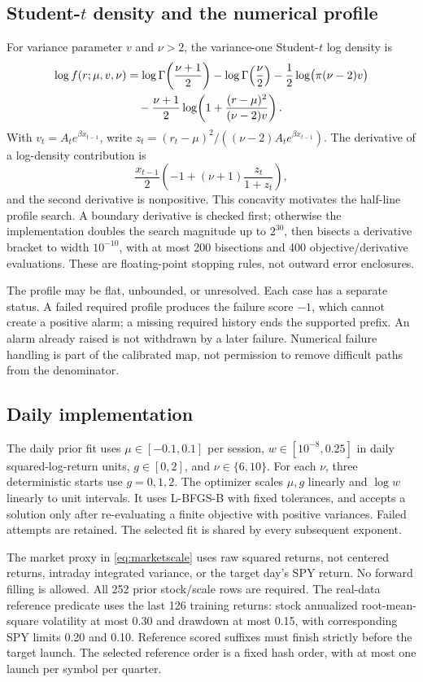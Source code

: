 \subsection{\texorpdfstring{Student-$t$}{Student-t} density and the numerical profile}
For variance parameter $v$ and $\nu>2$, the variance-one Student-$t$
log density is
\begin{align}\label{eq:tdensity}
 \log f(r;\mu,v,\nu)
 &=\log\Gamma\!\left(\frac{\nu+1}{2}\right)
  -\log\Gamma\!\left(\frac\nu2\right)
  -\frac12\log\bigl(\pi(\nu-2)v\bigr)\notag\\
 &\quad-\frac{\nu+1}{2}
      \log\!\left(1+\frac{(r-\mu)^2}{(\nu-2)v}\right).
\end{align}
With $v_t=A_t e^{\beta x_{t-1}}$, write
$z_t=(r_t-\mu)^2/((\nu-2)A_t e^{\beta x_{t-1}})$.
The derivative of a log-density contribution is
\[
 \frac{x_{t-1}}2\left(-1+(\nu+1)\frac{z_t}{1+z_t}\right),
\]
and the second derivative is nonpositive. This concavity motivates the
half-line profile search. A boundary derivative is checked first;
otherwise the implementation doubles the search magnitude up to
$2^{30}$, then bisects a derivative bracket to width $10^{-10}$, with
at most 200 bisections and 400 objective/derivative evaluations. These
are floating-point stopping rules, not outward error enclosures.

The profile may be flat, unbounded, or unresolved. Each case has a
separate status. A failed required profile produces the failure score
$-1$, which cannot create a positive alarm; a missing required history
ends the supported prefix. An alarm already raised is not withdrawn by
a later failure. Numerical failure handling is part of the calibrated
map, not permission to remove difficult paths from the denominator.

\subsection{Daily implementation}
The daily prior fit uses $\mu\in[-0.1,0.1]$ per session,
$w\in[10^{-8},0.25]$ in daily squared-log-return units,
$g\in[0,2]$, and $\nu\in\{6,10\}$. For each $\nu$, three
deterministic starts use $g=0,1,2$. The optimizer scales $\mu,g$
linearly and $\log w$ linearly to unit intervals. It uses L-BFGS-B with
fixed tolerances, and accepts a solution only after re-evaluating a
finite objective with positive variances. Failed attempts are retained.
The selected fit is shared by every subsequent exponent.

The market proxy in \eqref{eq:marketscale} uses raw squared returns,
not centered returns, intraday integrated variance, or the target day's
SPY return. No forward filling is allowed. All 252 prior stock/scale
rows are required. The real-data reference predicate uses the last
126 training returns: stock annualized root-mean-square volatility at
most 0.30 and drawdown at most 0.15, with corresponding SPY limits
0.20 and 0.10. Reference scored suffixes must finish strictly before
the target launch. The selected reference order is a fixed hash order,
with at most one launch per symbol per quarter.

